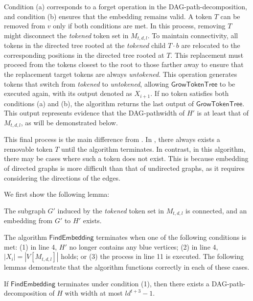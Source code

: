 \documentclass[runningheads]{llncs}
\theoremstyle{plain}
\theoremstyle{definition}
\begin{document}
Condition (a) corresponds to a forget operation in the DAG-path-decomposition, and condition (b) ensures that the embedding remains valid. A token $T$ can be removed from $v$ only if both conditions are met. In this process, removing $T$ might disconnect the \textit{tokened} token set in $M_{t, d, l}$. To maintain connectivity, all tokens in the directed tree rooted at the \textit{tokened} child $T \cdot b$ are relocated to the corresponding positions in the directed tree rooted at $T$. This replacement must proceed from the tokens closest to the root to those farther away to ensure that the replacement target tokens are always \textit{untokened}. This operation generates tokens that switch from \textit{tokened} to \textit{untokened}, allowing $\mathsf{GrowTokenTree}$ to be executed again, with its output denoted as $X_{i+1}$. If no token satisfies both conditions (a) and (b), the algorithm returns the last output of $\mathsf{GrowTokenTree}$. This output represents evidence that the DAG-pathwidth of $H'$ is at least that of $M_{t, d, l}$, as will be demonstrated below.

This final process is the main difference from \cite{art8}. In \cite{art8}, there always exists a removable token $T$ until the algorithm terminates. In contrast, in this algorithm, there may be cases where such a token does not exist. This is because embedding of directed graphs is more difficult than that of undirected graphs, as it requires considering the directions of the edges.  


We first show the following lemma:

\begin{lemma}\label{lemma_embedding}
    The subgraph $G'$ induced by the \textit{tokened} token set in $M_{t, d, l}$ is connected, and an embedding from $G'$ to $H'$ exists.
\end{lemma}




The algorithm $\mathsf{FindEmbedding}$ terminates when one of the following conditions is met: (1) in line 4, $H'$ no longer contains any blue vertices; (2) in line 4, $|X_i| = |V[M_{t, d, l}]|$ holds; or (3) the process in line 11 is executed. The following lemmas demonstrate that the algorithm functions correctly in each of these cases.

\begin{lemma}\label{lemma_(1)}
    If $\mathsf{FindEmbedding}$ terminates under condition (1), then there exists a DAG-path-decomposition of $H$ with width at most $ld^{t+3}-1$.
\end{lemma}
\end{document}
